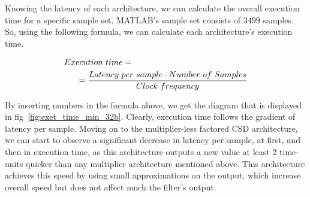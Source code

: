 Knowing the latency of each architecture, we can calculate the overall execution time for a specific sample set. MATLAB's sample set consists of $3499$ samples. So, using the following formula, we can calculate each architecture's execution time.
\begin{small}
\begin{equation}
	\centering
	\begin{split}
		Execution\hspace{3pt} time &= \\
		& \hspace{-55pt} =\frac{{Latency \hspace{3pt} per \hspace{3pt} sample}\cdot{Number \hspace{3pt} of \hspace{3pt} Samples}}{{Clock \hspace{3pt} frequency}}
	\end{split}
\end{equation}
\end{small}
By inserting numbers in the formula above, we get the diagram that is displayed in fig~\ref{fig:exet_time_min_32b}. Clearly, execution time follows the gradient of latency per sample.
Moving on to the multiplier-less factored CSD architecture, we can start to observe a significant decrease in latency per sample, at first, and then in execution time, as this architecture outputs a new value at least 2 time-units quicker than any multiplier architecture mentioned above. This architecture achieves this speed by using small approximations on the output, which increase overall speed but does not affect much the filter's output.


